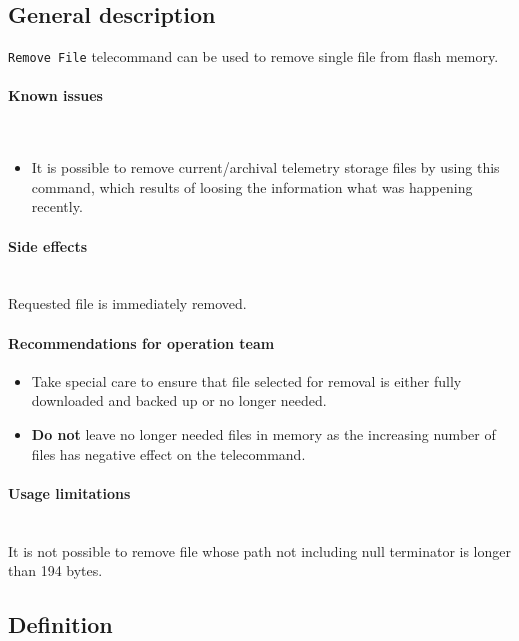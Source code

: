 

\subsection{General description}
\texttt{Remove File} telecommand can be used to remove single file from \obc flash memory. 

\paragraph{Known issues} \mbox{} \\
\begin{itemize}
    \item It is possible to remove current/archival telemetry storage files by using this command, which
    results of loosing the information what was happening recently. 
\end{itemize}

\paragraph{Side effects} \mbox{} \\
Requested file is immediately removed.

\paragraph{Recommendations for operation team}
\begin{itemize}
    \item Take special care to ensure that file selected for removal is either fully downloaded and
    backed up or no longer needed.
    \item \textbf{Do not} leave no longer needed files in memory as the increasing number of files has negative effect 
    on the  telecommand.
\end{itemize}

\paragraph{Usage limitations}\mbox{}\\ 
It is not possible to remove file whose path not including null terminator is longer than 194 bytes.

\subsection{Definition}

